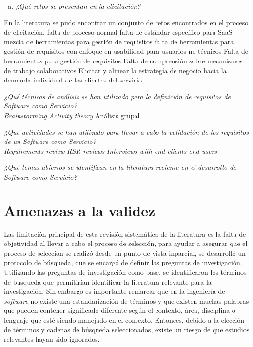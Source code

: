 \documentclass[conference,onecolumn,10pt]{IEEEtran}
\begin{document}
\begin{enumerate}[(a)]
\item \emph{¿Qué retos se presentan en la elicitación?}
\end{enumerate}
En la literatura se pudo encontrar un conjunto de retos encontrados en el proceso de elicitación, 
falta de proceso normal \cite{EF-2, EF-16, EF-19}
falta de estándar específico para SaaS \cite{EF-2}
mezcla de herramientas para gestión de requisitos \cite{EF-4, EF-9}
falta de herramientas para gestión de requisitos con enfoque en usabilidad para usuarios no técnicos \cite{EF-8}
Falta de herramientas para gestión de requisitos \cite{EF-9}
Falta de comprensión sobre mecanismos de trabajo colaborativos \cite{EF-7}
Elicitar y alinear la estrategía de negocio hacia la demanda individual de los clientes del servicio. \cite{EF-18}

\emph{¿Qué técnicas de análisis se han utilizado para la definición de requisitos de Software como Servicio?}\\
\emph{Brainstorming} \cite{EF-10}
\emph{Activity theory} \cite{EF-7}
Análisis grupal \cite{EF-3, EF-4, EF-13, EF-17, EF-19} 

\emph{¿Qué actividades se han utilizado para llevar a cabo la validación de los requisitos de un Software como Servicio?}\\
\emph{Requirements review} \cite{EF-1, EF-3}
\emph{RSR reviews} \cite{EF-6}
\emph{Interviews with end clients-end users} \cite{EF-2, EF-4, EF-5, EF-8, EF-9, EF-12, EF-19,}

\emph{¿Qué temas abiertos se identifican en la literatura reciente en el desarrollo de Software como Servicio?}\\

\section{Amenazas a la validez}
Las limitación principal de esta revisión sistemática de la literatura es la falta de objetividad al llevar a cabo el proceso de selección, 
para ayudar a asegurar que el proceso de selección se realizó desde un punto de vista inparcial, se desarrolló un protocolo de búsqueda, que se 
encargó de definir las preguntas de investigación. Utilizando las preguntas de investigación como base, se identificaron los términos de búsqueda 
que permitirían identificar la literatura relevante para la investigación. Sin embargo es importante remarcar que en la ingeniería de \emph{software}
no existe una estandarización de términos y que existen muchas palabras que pueden contener significado diferente según el contexto, área, disciplina o 
lenguaje que esté siendo manejado en el contexto. Entonces, debido a la elección de términos y cadenas de búsqueda seleccionados, existe un riesgo de que 
estudios relevantes hayan sido ignorados. 
\end{document}
